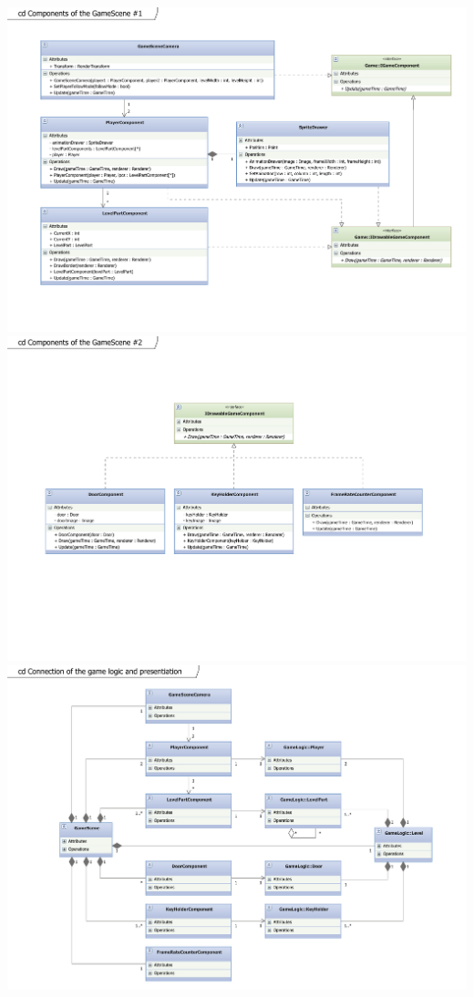 \begin{center}
\newpage
\includegraphics[scale=0.7,angle=90]{GameSceneComponents.pdf}
\newpage
\includegraphics[scale=0.7,angle=90]{GameSceneComponents2.pdf}
\newpage
\includegraphics[scale=0.7,angle=90]{GameLogicPresentationConnection.pdf}
\newpage
\end{center}

